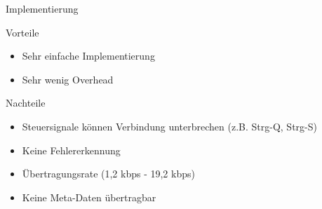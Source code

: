 \documentclass[beamer]{uibk}
\begin{document}
\begin{frame}{Implementierung}
  \newpage
  \begin{center}
    
  \end{center}
\end{frame}

\begin{frame}{}
    \begin{block}{Vorteile}
      \begin{itemize}
        \item Sehr einfache Implementierung
        \item Sehr wenig Overhead
      \end{itemize}
    \end{block}
    \pause
    \begin{alertblock}{Nachteile}
      \begin{itemize}
        \item Steuersignale können Verbindung unterbrechen (z.B. Strg-Q, Strg-S)
        \item Keine Fehlererkennung
        \item Übertragungsrate (1,2 kbps - 19,2 kbps)
        \item Keine Meta-Daten übertragbar
      \end{itemize}
    \end{alertblock}

\end{frame}
\end{document}
